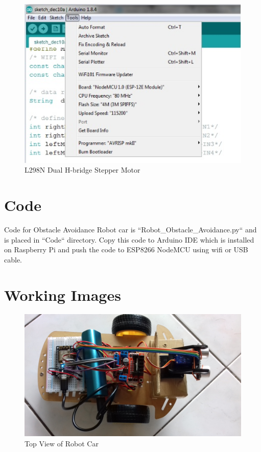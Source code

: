 \documentclass[sigconf]{acmart}
\begin{document}
\begin{figure}
	\includegraphics[width=1.0\columnwidth]{images/Arduino-settings.jpg}
	\caption{L298N Dual H-bridge Stepper Motor}
\end{figure}

\section{Code}
Code for Obstacle Avoidance Robot car is ``Robot\_Obstacle\_Avoidance.py`` and is placed in ``Code`` directory. Copy this code to Arduino IDE which is installed on Raspberry Pi and push the code to ESP8266 NodeMCU using wifi or USB cable.

\section{Working Images}

\begin{figure}
	\includegraphics[width=1.0\columnwidth]{images/Top-view.jpg}
	\caption{Top View of Robot Car}
\end{figure}
\end{document}
